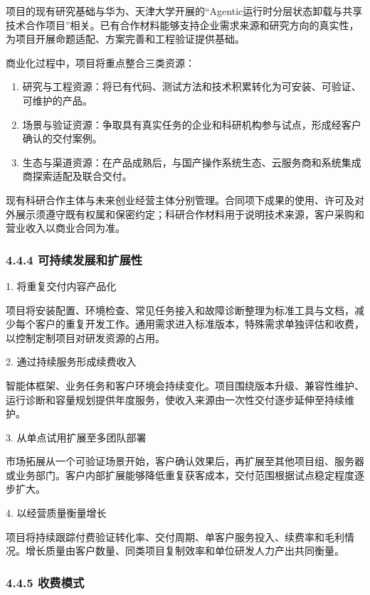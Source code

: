 项目的现有研究基础与华为、天津大学开展的``Agentic运行时分层状态卸载与共享技术合作项目''相关。已有合作材料能够支持企业需求来源和研究方向的真实性，为项目开展命题适配、方案完善和工程验证提供基础。

商业化过程中，项目将重点整合三类资源：

\begin{enumerate}

\item
  研究与工程资源：将已有代码、测试方法和技术积累转化为可安装、可验证、可维护的产品。
\item
  场景与验证资源：争取具有真实任务的企业和科研机构参与试点，形成经客户确认的交付案例。
\item
  生态与渠道资源：在产品成熟后，与国产操作系统生态、云服务商和系统集成商探索适配及联合交付。
\end{enumerate}

现有科研合作主体与未来创业经营主体分别管理。合同项下成果的使用、许可及对外展示须遵守既有权属和保密约定；科研合作材料用于说明技术来源，客户采购和营业收入以商业合同为准。

\subsubsection{4.4.4 可持续发展和扩展性}\label{ux53efux6301ux7eedux53d1ux5c55ux548cux6269ux5c55ux6027}

1. 将重复交付内容产品化

项目将安装配置、环境检查、常见任务接入和故障诊断整理为标准工具与文档，减少每个客户的重复开发工作。通用需求进入标准版本，特殊需求单独评估和收费，以控制定制项目对研发资源的占用。

2. 通过持续服务形成续费收入

智能体框架、业务任务和客户环境会持续变化。项目围绕版本升级、兼容性维护、运行诊断和容量规划提供年度服务，使收入来源由一次性交付逐步延伸至持续维护。

3. 从单点试用扩展至多团队部署

市场拓展从一个可验证场景开始，客户确认效果后，再扩展至其他项目组、服务器或业务部门。客户内部扩展能够降低重复获客成本，交付范围根据试点稳定程度逐步扩大。

4. 以经营质量衡量增长

项目将持续跟踪付费验证转化率、交付周期、单客户服务投入、续费率和毛利情况。增长质量由客户数量、同类项目复制效率和单位研发人力产出共同衡量。

\subsubsection{4.4.5 收费模式}\label{ux6536ux8d39ux6a21ux5f0f}


